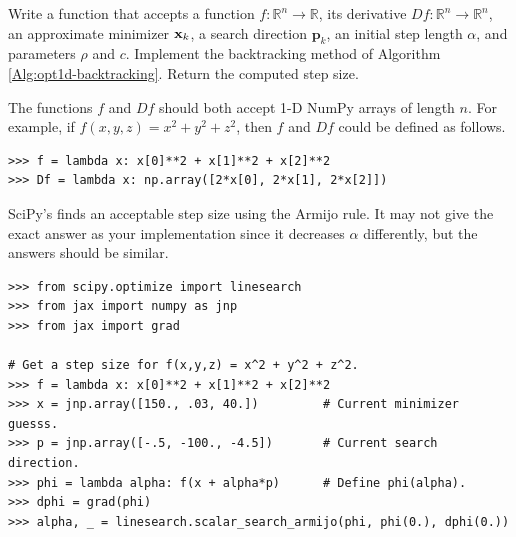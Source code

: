 \begin{problem}
Write a function that accepts a function $f:\mathbb{R}^n\rightarrow\mathbb{R}$, its derivative $Df:\mathbb{R}^n\rightarrow\mathbb{R}^n$, an approximate minimizer $\mathbf{x}_k$, a search direction $\textbf{p}_k$, an initial step length $\alpha$, and parameters $\rho$ and $c$.
Implement the backtracking method of Algorithm \ref{Alg:opt1d-backtracking}.
Return the computed step size.

The functions $f$ and $Df$ should both accept 1-D NumPy arrays of length $n$.
For example, if $f(x,y,z) = x^2 + y^2 + z^2$, then $f$ and $Df$ could be defined as follows.
\begin{lstlisting}
>>> f = lambda x: x[0]**2 + x[1]**2 + x[2]**2
>>> Df = lambda x: np.array([2*x[0], 2*x[1], 2*x[2]])
\end{lstlisting}

SciPy's  finds an acceptable step size using the Armijo rule.
It may not give the exact answer as your implementation since it decreases $\alpha$ differently, but the answers should be similar.
\begin{lstlisting}
>>> from scipy.optimize import linesearch
>>> from jax import numpy as jnp
>>> from jax import grad

# Get a step size for f(x,y,z) = x^2 + y^2 + z^2.
>>> f = lambda x: x[0]**2 + x[1]**2 + x[2]**2
>>> x = jnp.array([150., .03, 40.])         # Current minimizer guesss.
>>> p = jnp.array([-.5, -100., -4.5])       # Current search direction.
>>> phi = lambda alpha: f(x + alpha*p)      # Define phi(alpha).
>>> dphi = grad(phi)
>>> alpha, _ = linesearch.scalar_search_armijo(phi, phi(0.), dphi(0.))
\end{lstlisting}
\end{problem}

